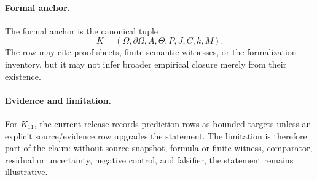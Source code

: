 \paragraph{Formal anchor.}
The formal anchor is the canonical tuple
\[
  K=(\Omega,\partial\Omega,A,\Theta,P,J,C,k,M).
\]
The row may cite proof sheets, finite semantic witnesses, or the formalization
inventory, but it may not infer broader empirical closure merely from their
existence.

\paragraph{Evidence and limitation.}
For \(K_11\), the current release records prediction rows as bounded
targets unless an explicit source/evidence row upgrades the statement. The
limitation is therefore part of the claim: without source snapshot, formula or
finite witness, comparator, residual or uncertainty, negative control, and
falsifier, the statement remains illustrative.
